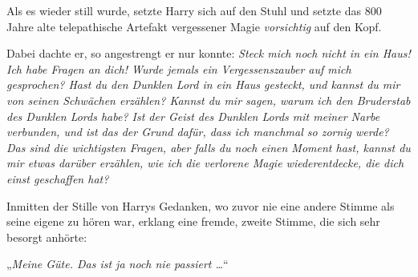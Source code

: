 Als es wieder still wurde, setzte Harry sich auf den Stuhl und setzte das 800 Jahre alte telepathische Artefakt vergessener Magie \emph{vorsichtig} auf den Kopf.

Dabei dachte er, so angestrengt er nur konnte: \emph{Steck mich noch nicht in ein Haus! Ich habe Fragen an dich! Wurde jemals ein Vergessenszauber auf mich gesprochen? Hast du den Dunklen Lord in ein Haus gesteckt, und kannst du mir von seinen Schwächen erzählen? Kannst du mir sagen, warum ich den Bruderstab des Dunklen Lords habe? Ist der Geist des Dunklen Lords mit meiner Narbe verbunden, und ist das der Grund dafür, dass ich manchmal so zornig werde? Das sind die wichtigsten Fragen, aber falls du noch einen Moment hast, kannst du mir etwas darüber erzählen, wie ich die verlorene Magie wiederentdecke, die dich einst geschaffen hat?}

Inmitten der Stille von Harrys Gedanken, wo zuvor nie eine andere Stimme als seine eigene zu hören war, erklang eine fremde, zweite Stimme, die sich sehr besorgt anhörte:

„\emph{Meine Güte. Das ist ja noch nie passiert …}“


